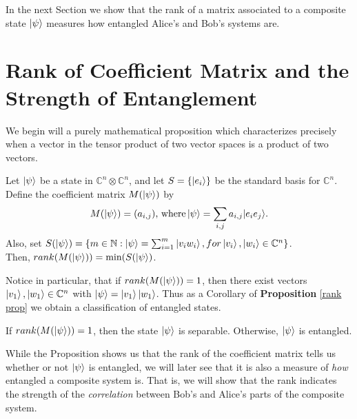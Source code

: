 In the next Section we show that the rank of a matrix associated to a composite state $\ket{\psi}$ measures how entangled Alice's and Bob's systems are.

\pagebreak

\section{Rank of Coefficient Matrix and the Strength of Entanglement}

We begin will a purely mathematical proposition which characterizes precisely when a vector in the tensor product of two vector spaces is a product of two vectors.

\begin{prop}
\label{rank prop}
Let $\ket{\psi}$ be a state in $\mathbb{C}^n \otimes \mathbb{C}^n$, and let $S=\{\ket{e_i}\}$ be the standard basis for $\mathbb{C}^n$. Define the coefficient matrix $M(\ket{\psi})$ by
\begin{equation}
M(\ket{\psi})=(a_{i,j}) \textrm{, where}\ket{\psi}=\sum\limits_{i,j}a_{i,j}|e_i e_j\rangle . 
\end{equation}
Also, set $S(\ket{\psi})=\{m\in \mathbb{N}: \ket{\psi}=\sum_{i=1}^m\ket{v_i w_i}, for \ket{v_i}, \ket{w_i} \in \mathbb{C}^n\}$.\\  Then, $rank(M(\ket{\psi}))=\textrm{min} (S(\ket{\psi})$.
\end{prop}

Notice in particular, that if $rank(M(\ket{\psi}))=1$, then there exist vectors $\ket{v_1}, \ket{w_1} \in \mathbb{C}^n$ with $\ket{\psi}=\ket{v_1}\ket{w_1}$.  Thus as a Corollary of {\bf{Proposition}} \ref{rank prop} we obtain a classification of entangled states.
\begin{corollary}
If $rank(M(\ket{\psi}))=1$, then the state $\ket{\psi}$ is separable. Otherwise, $\ket{\psi}$ is entangled.
\end{corollary}

While the Proposition shows us that the rank of the coefficient matrix tells us whether or not $\ket{\psi}$ is entangled, we will later see that it is also a measure of {\emph{how}} entangled a composite system is. That is, we will show that the rank indicates the strength of the {\emph{correlation}} between Bob's and Alice's parts of the composite system.

